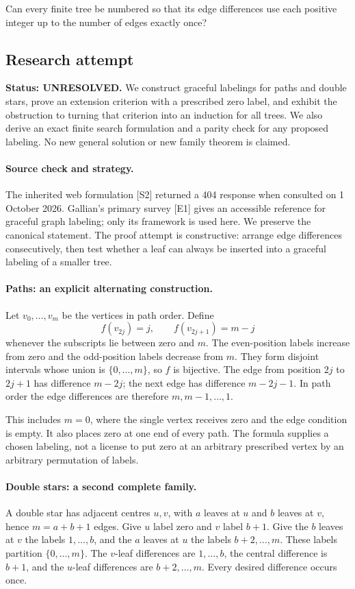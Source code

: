 \documentclass[11pt,a4paper]{article}
\begin{document}
Can every finite tree be numbered so that its edge differences use each positive integer up to the number of edges exactly once?

\subsection{Research attempt}
\textbf{Status: UNRESOLVED.} We construct graceful labelings for paths and double stars, prove an extension criterion with a prescribed zero label, and exhibit the obstruction to turning that criterion into an induction for all trees. We also derive an exact finite search formulation and a parity check for any proposed labeling. No new general solution or new family theorem is claimed.

\paragraph{Source check and strategy.}
The inherited web formulation [S2] returned a 404 response when consulted on 1 October 2026. Gallian's primary survey [E1] gives an accessible reference for graceful graph labeling; only its framework is used here. We preserve the canonical statement. The proof attempt is constructive: arrange edge differences consecutively, then test whether a leaf can always be inserted into a graceful labeling of a smaller tree.

\paragraph{Paths: an explicit alternating construction.}
Let $v_0,\ldots,v_m$ be the vertices in path order. Define
\[
f(v_{2j})=j,\qquad f(v_{2j+1})=m-j
\]
whenever the subscripts lie between zero and $m$. The even-position labels increase from zero and the odd-position labels decrease from $m$. They form disjoint intervals whose union is $\{0,\ldots,m\}$, so $f$ is bijective. The edge from position $2j$ to $2j+1$ has difference $m-2j$; the next edge has difference $m-2j-1$. In path order the edge differences are therefore $m,m-1,\ldots,1$.

This includes $m=0$, where the single vertex receives zero and the edge condition is empty. It also places zero at one end of every path. The formula supplies a chosen labeling, not a license to put zero at an arbitrary prescribed vertex by an arbitrary permutation of labels.

\paragraph{Double stars: a second complete family.}
A double star has adjacent centres $u,v$, with $a$ leaves at $u$ and $b$ leaves at $v$, hence $m=a+b+1$ edges. Give $u$ label zero and $v$ label $b+1$. Give the $b$ leaves at $v$ the labels $1,\ldots,b$, and the $a$ leaves at $u$ the labels $b+2,\ldots,m$. These labels partition $\{0,\ldots,m\}$. The $v$-leaf differences are $1,\ldots,b$, the central difference is $b+1$, and the $u$-leaf differences are $b+2,\ldots,m$. Every desired difference occurs once.
\end{document}
